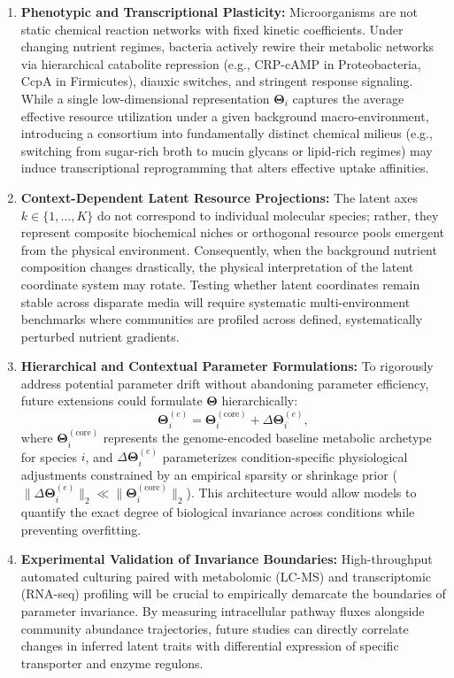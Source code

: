 \begin{enumerate}
    \item \textbf{Phenotypic and Transcriptional Plasticity:} Microorganisms are not static chemical reaction networks with fixed kinetic coefficients. Under changing nutrient regimes, bacteria actively rewire their metabolic networks via hierarchical catabolite repression (e.g., CRP-cAMP in Proteobacteria, CcpA in Firmicutes), diauxic switches, and stringent response signaling. While a single low-dimensional representation $\mathbf{\Theta}_i$ captures the average effective resource utilization under a given background macro-environment, introducing a consortium into fundamentally distinct chemical milieus (e.g., switching from sugar-rich broth to mucin glycans or lipid-rich regimes) may induce transcriptional reprogramming that alters effective uptake affinities.
    
    \item \textbf{Context-Dependent Latent Resource Projections:} The latent axes $k \in \{1, \dots, K\}$ do not correspond to individual molecular species; rather, they represent composite biochemical niches or orthogonal resource pools emergent from the physical environment. Consequently, when the background nutrient composition changes drastically, the physical interpretation of the latent coordinate system may rotate. Testing whether latent coordinates remain stable across disparate media will require systematic multi-environment benchmarks where communities are profiled across defined, systematically perturbed nutrient gradients.
    
    \item \textbf{Hierarchical and Contextual Parameter Formulations:} To rigorously address potential parameter drift without abandoning parameter efficiency, future extensions could formulate $\mathbf{\Theta}$ hierarchically:
    \begin{equation}
    \mathbf{\Theta}_{i}^{(e)} = \mathbf{\Theta}_{i}^{(\text{core})} + \Delta \mathbf{\Theta}_{i}^{(e)},
    \end{equation}
    where $\mathbf{\Theta}_{i}^{(\text{core})}$ represents the genome-encoded baseline metabolic archetype for species $i$, and $\Delta \mathbf{\Theta}_{i}^{(e)}$ parameterizes condition-specific physiological adjustments constrained by an empirical sparsity or shrinkage prior ($\|\Delta \mathbf{\Theta}_{i}^{(e)}\|_2 \ll \|\mathbf{\Theta}_{i}^{(\text{core})}\|_2$). This architecture would allow models to quantify the exact degree of biological invariance across conditions while preventing overfitting.
    
    \item \textbf{Experimental Validation of Invariance Boundaries:} High-throughput automated culturing paired with metabolomic (LC-MS) and transcriptomic (RNA-seq) profiling will be crucial to empirically demarcate the boundaries of parameter invariance. By measuring intracellular pathway fluxes alongside community abundance trajectories, future studies can directly correlate changes in inferred latent traits with differential expression of specific transporter and enzyme regulons.
\end{enumerate}



